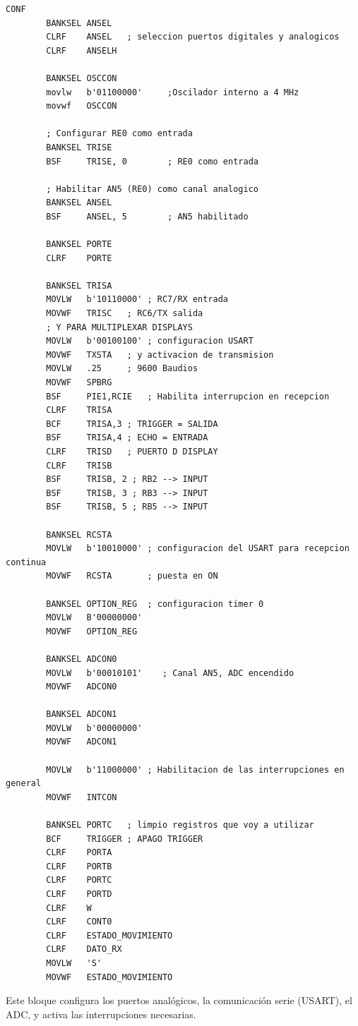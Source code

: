 \documentclass[]{article}
\begin{document}
	\begin{lstlisting}[caption={Configuración de puertos, ADC, USART, variables}, label={lst:config}]
		CONF
		BANKSEL ANSEL
		CLRF    ANSEL   ; seleccion puertos digitales y analogicos
		CLRF    ANSELH
		
		BANKSEL OSCCON
		movlw   b'01100000'	    ;Oscilador interno a 4 MHz	
		movwf   OSCCON
		
		; Configurar RE0 como entrada
		BANKSEL TRISE
		BSF     TRISE, 0        ; RE0 como entrada
		
		; Habilitar AN5 (RE0) como canal analogico
		BANKSEL ANSEL
		BSF     ANSEL, 5        ; AN5 habilitado
		
		BANKSEL PORTE
		CLRF    PORTE
		
		BANKSEL TRISA
		MOVLW   b'10110000'	; RC7/RX entrada
		MOVWF   TRISC	; RC6/TX salida
		; Y PARA MULTIPLEXAR DISPLAYS
		MOVLW   b'00100100'	; configuracion USART
		MOVWF   TXSTA	; y activacion de transmision
		MOVLW   .25		; 9600 Baudios
		MOVWF   SPBRG
		BSF	    PIE1,RCIE	; Habilita interrupcion en recepcion
		CLRF    TRISA
		BCF	    TRISA,3 ; TRIGGER = SALIDA
		BSF	    TRISA,4 ; ECHO = ENTRADA
		CLRF    TRISD   ; PUERTO D DISPLAY
		CLRF    TRISB
		BSF	    TRISB, 2 ; RB2 --> INPUT
		BSF	    TRISB, 3 ; RB3 --> INPUT
		BSF	    TRISB, 5 ; RB5 --> INPUT
		
		BANKSEL RCSTA
		MOVLW   b'10010000'	; configuracion del USART para recepcion continua
		MOVWF   RCSTA		; puesta en ON
		
		BANKSEL OPTION_REG	; configuracion timer 0
		MOVLW   B'00000000'
		MOVWF   OPTION_REG
		
		BANKSEL ADCON0
		MOVLW   b'00010101'    ; Canal AN5, ADC encendido
		MOVWF   ADCON0
		
		BANKSEL ADCON1
		MOVLW   b'00000000'   
		MOVWF   ADCON1
		
		MOVLW   b'11000000'	; Habilitacion de las interrupciones en general
		MOVWF   INTCON
		
		BANKSEL PORTC   ; limpio registros que voy a utilizar
		BCF	    TRIGGER ; APAGO TRIGGER
		CLRF    PORTA
		CLRF    PORTB
		CLRF    PORTC
		CLRF    PORTD
		CLRF    W
		CLRF    CONT0
		CLRF    ESTADO_MOVIMIENTO
		CLRF    DATO_RX
		MOVLW   'S'
		MOVWF   ESTADO_MOVIMIENTO
	\end{lstlisting}
	
	\newpage
	\thispagestyle{fancy}
	
	Este bloque configura los puertos analógicos, la comunicación serie (USART), el ADC, y activa las interrupciones necesarias.
	
\end{document}
